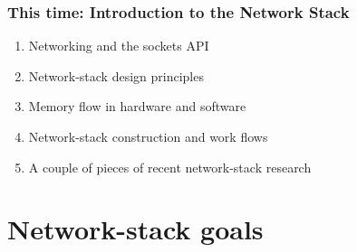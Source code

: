 \begin{frame}
  \frametitle{This time: Introduction to the Network Stack}

  \begin{enumerate}
    \item Networking and the sockets API
    \item Network-stack design principles
    \item Memory flow in hardware and software
    \item Network-stack construction and work flows
    \item A couple of pieces of recent network-stack research
  \end{enumerate}
\end{frame}

\section{Network-stack goals}

